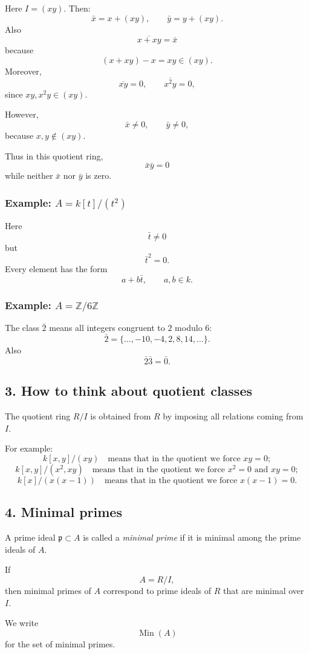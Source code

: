 \documentclass[12pt,a4paper,oneside]{report}
\DeclareMathOperator{\Min}{Min}
\theoremstyle{notespace}
\begin{document}
Here \(I=(xy)\). Then:
\[
\bar x=x+(xy),\qquad \bar y=y+(xy).
\]
Also
\[
\overline{x+xy}=\bar x
\]
because
\[
(x+xy)-x=xy\in(xy).
\]
Moreover,
\[
\overline{xy}=0,\qquad \overline{x^2y}=0,
\]
since \(xy,x^2y\in(xy)\).

However,
\[
\bar x\neq 0,\qquad \bar y\neq 0,
\]
because \(x,y\notin(xy)\).

Thus in this quotient ring,
\[
\bar x\bar y=0
\]
while neither \(\bar x\) nor \(\bar y\) is zero.

\subsubsection{Example: \(A=k[t]/(t^2)\)}

Here
\[
\bar t\neq 0
\]
but
\[
\bar t^2=0.
\]
Every element has the form
\[
a+b\bar t,\qquad a,b\in k.
\]

\subsubsection{Example: \(A=\mathbb Z/6\mathbb Z\)}

The class \(\bar2\) means all integers congruent to \(2\) modulo \(6\):
\[
\bar2=\{\dots,-10,-4,2,8,14,\dots\}.
\]
Also
\[
\bar2\bar3=\bar0.
\]

\subsection{3. How to think about quotient classes}

The quotient ring \(R/I\) is obtained from \(R\) by imposing all relations coming from \(I\).

For example:
\[
k[x,y]/(xy)\quad \text{means that in the quotient we force }xy=0;
\]
\[
k[x,y]/(x^2,xy)\quad \text{means that in the quotient we force }x^2=0\text{ and }xy=0;
\]
\[
k[x]/(x(x-1))\quad \text{means that in the quotient we force }x(x-1)=0.
\]

\subsection{4. Minimal primes}

A prime ideal \(\mathfrak p\subset A\) is called a \emph{minimal prime} if it is minimal among the prime ideals of \(A\).

If
\[
A=R/I,
\]
then minimal primes of \(A\) correspond to prime ideals of \(R\) that are minimal over \(I\).

We write
\[
\Min(A)
\]
for the set of minimal primes.
\end{document}
